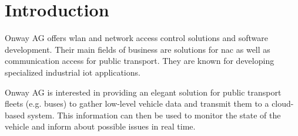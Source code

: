 \section{Introduction}
\label{sec:intro}
Onway AG offers \acrshort{wlan} and network access control solutions and software development. Their main fields of business are solutions for \acrfull{nac} as well as communication access for public transport. They are known for developing specialized industrial \acrshort{iot} applications.


Onway AG is interested in providing an elegant solution for public transport fleets (e.g. buses) to gather low-level vehicle data and transmit them to a cloud-based system. This information can then be used to monitor the state of the vehicle and inform about possible issues in real time.